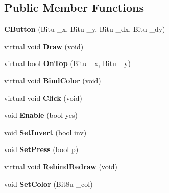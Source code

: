 \subsection*{Public Member Functions}
\begin{DoxyCompactItemize}
\item 
\hypertarget{classCButton_acb852749fa38d2484ca1de00df13bcf4}{{\bfseries C\-Button} (Bitu \-\_\-x, Bitu \-\_\-y, Bitu \-\_\-dx, Bitu \-\_\-dy)}\label{classCButton_acb852749fa38d2484ca1de00df13bcf4}

\item 
\hypertarget{classCButton_a78a06b7c9e6994399c993f1af9ee38b8}{virtual void {\bfseries Draw} (void)}\label{classCButton_a78a06b7c9e6994399c993f1af9ee38b8}

\item 
\hypertarget{classCButton_a9eee48a08f92ab14f41d4a62f1bfb1d4}{virtual bool {\bfseries On\-Top} (Bitu \-\_\-x, Bitu \-\_\-y)}\label{classCButton_a9eee48a08f92ab14f41d4a62f1bfb1d4}

\item 
\hypertarget{classCButton_aa31add179ce4c1b0c2efb99cf7da5678}{virtual void {\bfseries Bind\-Color} (void)}\label{classCButton_aa31add179ce4c1b0c2efb99cf7da5678}

\item 
\hypertarget{classCButton_ae56bdd7d3c4fb7e2e1f0634e5dbe1cc7}{virtual void {\bfseries Click} (void)}\label{classCButton_ae56bdd7d3c4fb7e2e1f0634e5dbe1cc7}

\item 
\hypertarget{classCButton_ab1661c655cd9ba77065f7944f89c162c}{void {\bfseries Enable} (bool yes)}\label{classCButton_ab1661c655cd9ba77065f7944f89c162c}

\item 
\hypertarget{classCButton_a44707745a86d060e0891f0d8b55c243a}{void {\bfseries Set\-Invert} (bool inv)}\label{classCButton_a44707745a86d060e0891f0d8b55c243a}

\item 
\hypertarget{classCButton_a43025d039151e61d4895143375b52385}{void {\bfseries Set\-Press} (bool p)}\label{classCButton_a43025d039151e61d4895143375b52385}

\item 
\hypertarget{classCButton_a08278e70099919ddc5b53b1445e21247}{virtual void {\bfseries Rebind\-Redraw} (void)}\label{classCButton_a08278e70099919ddc5b53b1445e21247}

\item 
\hypertarget{classCButton_a3530826dc5f15b557074560e255d6672}{void {\bfseries Set\-Color} (Bit8u \-\_\-col)}\label{classCButton_a3530826dc5f15b557074560e255d6672}

\end{DoxyCompactItemize}
